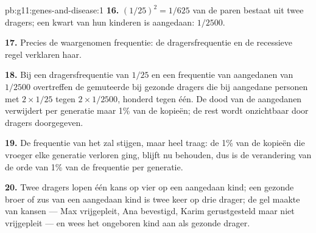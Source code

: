 \begin{solution}{pb:g11:genes-and-disease:1}
\textbf{16.} $(1/25)^2 = 1/625$ van de paren bestaat uit twee dragers; een
kwart van hun kinderen is aangedaan: $1/2500$.

\textbf{17.} Precies de waargenomen frequentie: de dragersfrequentie en de
recessieve regel verklaren haar.

\textbf{18.} Bij een dragersfrequentie van $1/25$ en een frequentie van
aangedanen van $1/2500$ overtreffen de gemuteerde  bij gezonde
dragers die bij aangedane personen met $2 \times 1/25$ tegen $2 \times
1/2500$, honderd tegen één. De dood van de aangedanen verwijdert per
generatie maar 1\% van de kopieën; de rest wordt onzichtbaar door dragers
doorgegeven.

\textbf{19.} De frequentie van het  zal stijgen, maar heel traag: de
1\% van de kopieën die vroeger elke generatie verloren ging, blijft nu
behouden, dus is de verandering van de orde van 1\% van de frequentie per
generatie.

\textbf{20.} Twee dragers lopen één kans op vier op een aangedaan kind;
een gezonde broer of zus van een aangedaan kind is twee keer op drie
drager; de gel maakte van kansen  --- Max vrijgepleit, Ana
bevestigd, Karim gerustgesteld maar niet vrijgepleit --- en wees het
ongeboren kind aan als gezonde drager.
\end{solution}
